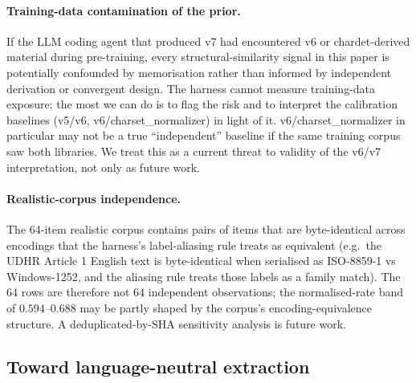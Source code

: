 \documentclass[11pt,letterpaper]{article}
\begin{document}
\paragraph{Training-data contamination of the prior.}
If the LLM coding agent that produced v7 had encountered v6 or
chardet-derived material during pre-training, every
structural-similarity signal in this paper is potentially
confounded by memorisation rather than informed by independent
derivation or convergent design. The harness cannot measure
training-data exposure; the most we can do is to flag the risk
and to interpret the calibration baselines (v5/v6,
v6/charset\_normalizer) in light of it. v6/charset\_normalizer in
particular may not be a true ``independent'' baseline if the same
training corpus saw both libraries. We treat this as a current
threat to validity of the v6/v7 interpretation, not only as
future work.

\paragraph{Realistic-corpus independence.}
The 64-item realistic corpus contains pairs of items that are
byte-identical across encodings that the harness's
label-aliasing rule treats as equivalent (e.g.\ the UDHR Article 1
English text is byte-identical when serialised as ISO-8859-1 vs
Windows-1252, and the aliasing rule treats those labels as a
family match). The 64 rows are therefore not 64 independent
observations; the normalised-rate band of $0.594$--$0.688$ may be
partly shaped by the corpus's encoding-equivalence structure. A
deduplicated-by-SHA sensitivity analysis is future work.

\subsection{Toward language-neutral extraction}
\label{sec:walker-seam}
\end{document}
